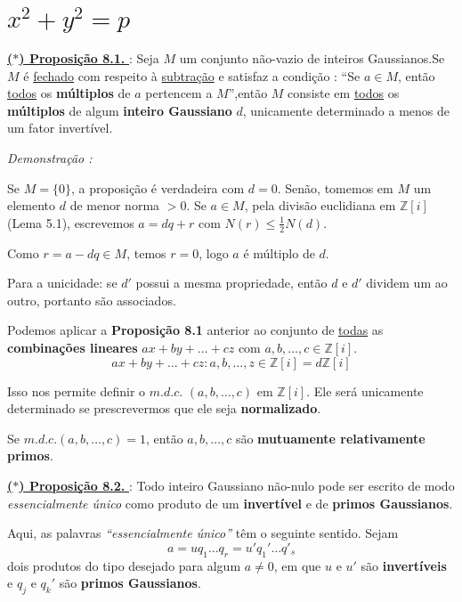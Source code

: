 \section*{$x^2 + y^2 = p$}

\noindent\underline{\underline{\textbf{($\ast$) Proposição 8.1. }}} : Seja $M$ um conjunto não-vazio de inteiros Gaussianos.Se
$M$ é \underline{fechado} com respeito à \underline{subtração} e satisfaz a condição : “Se $a \in M$, então \underline{todos} os \textbf{múltiplos} 
de $a$ pertencem a $M$”,então $M$ consiste em \underline{todos} os \textbf{múltiplos} de algum 
\textbf{inteiro Gaussiano} $d$, unicamente determinado a menos de um fator invertível.

\vspace{0.2cm}
\noindent\textit{Demonstração : }

Se $M=\{0\}$, a proposição é verdadeira com $d=0$.  
Senão, tomemos em $M$ um elemento $d$ de menor norma $>0$.  
Se $a\in M$, pela divisão euclidiana em $\mathbb{Z}[i]$ (Lema 5.1), 
escrevemos $a = dq + r$ com $N(r) \leq \tfrac{1}{2}N(d)$.  

Como $r = a - dq \in M$, temos $r=0$, logo $a$ é múltiplo de $d$.  

Para a unicidade: se $d'$ possui a mesma propriedade, então $d$ e $d'$ dividem um ao outro, 
portanto são associados.

\vspace{0.3cm}

Podemos aplicar a \textbf{Proposição 8.1} anterior ao conjunto de \underline{todas} as \textbf{combinações lineares} 
$ax + by + \ldots + cz$ com $a,b,\dots,c \in \mathbb{Z}[i]$.  
\[
ax+ by + \ldots + cz : a,b,\ldots,z \in \mathbb{Z}[i] = d\mathbb{Z}[i]
\]

Isso nos permite definir o $m.d.c.$ $(a,b,\ldots,c)$ em $\mathbb{Z}[i]$.  
Ele será unicamente determinado se prescrevermos que ele seja \textbf{normalizado}.

Se $m.d.c.(a,b,\ldots,c) = 1$, então $a, b, \ldots , c$ são \textbf{mutuamente relativamente primos}.

\vspace{0.2cm}
\noindent\underline{\underline{\textbf{($\ast$) Proposição 8.2. }}} : Todo inteiro Gaussiano não-nulo pode ser escrito de modo 
\emph{essencialmente único} como produto de um \textbf{invertível} e de \textbf{primos Gaussianos}.

\vspace{0.2cm}

Aqui, as palavras \textit{“essencialmente único”} têm o seguinte sentido. 
Sejam 
\[
a = uq_1 \ldots q_r = u'q_1' \ldots q'_s
\]
dois produtos do tipo desejado para algum $a \neq 0$, em que $u$ e $u'$ são 
\textbf{invertíveis} e $q_j$ e $q_k'$ são \textbf{primos Gaussianos}. 

